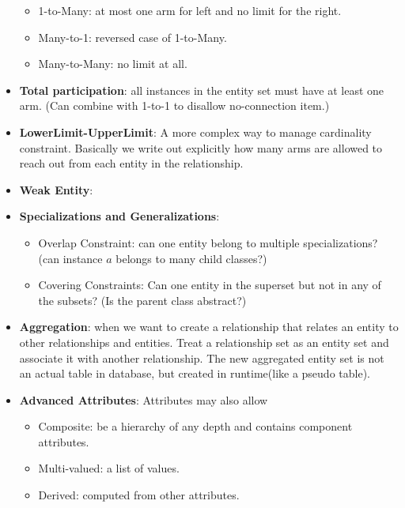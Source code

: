 \documentclass{ainote}
\begin{document}
\begin{itemize}
\begin{itemize}
        \item 1-to-Many: at most one arm for left and no limit for the right.
        \item Many-to-1: reversed case of 1-to-Many.
        \item Many-to-Many: no limit at all.
    \end{itemize}
    \item \textbf{Total participation}: all instances in the entity set must have at least one arm. (Can combine with 1-to-1 to disallow no-connection item.) 
    \item \textbf{LowerLimit-UpperLimit}: A more complex way to manage cardinality constraint. Basically we write out explicitly how many arms are allowed to reach out from each entity in the relationship.

    \item \textbf{Weak Entity}:   

    \item \textbf{Specializations and Generalizations}: 
    \begin{itemize}
        \item Overlap Constraint: can one entity belong to multiple specializations? (can instance $a$ belongs to many child classes?)
        \item Covering Constraints: Can one entity in the superset but not in any of the subsets? (Is the parent class abstract?)
    \end{itemize}

    \item \textbf{Aggregation}: when we want to create a relationship that relates an entity to other relationships and entities. Treat a relationship set as an entity set and associate it with another relationship. The new aggregated entity set is not an actual table in database, but created in runtime(like a pseudo table).

    \item \textbf{Advanced Attributes}: Attributes may also allow
    \begin{itemize}
        \item Composite: be a hierarchy of any depth and contains component attributes.
        \item Multi-valued: a list of values.
        \item Derived: computed from other attributes.
    \end{itemize}
\end{itemize}
\end{document}
